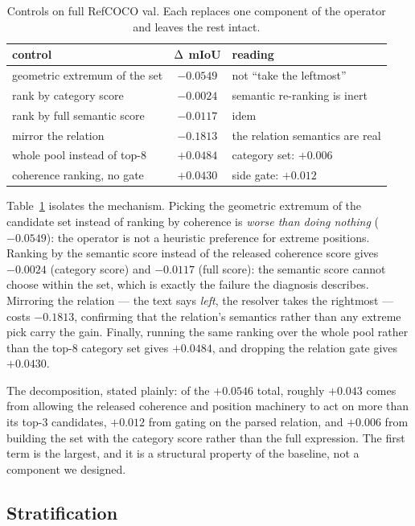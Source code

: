 \begin{table}[t]
\caption{Controls on full RefCOCO val. Each replaces one component of the
operator and leaves the rest intact.}
\label{tab:controls}
\centering
\footnotesize
\setlength{\tabcolsep}{4pt}
\begin{tabular}{@{}lcl@{}}
\toprule
control & $\Delta$ mIoU & reading \\
\midrule
geometric extremum of the set & $-0.0549$ & not ``take the leftmost'' \\
rank by category score        & $-0.0024$ & semantic re-ranking is inert \\
rank by full semantic score   & $-0.0117$ & idem \\
mirror the relation           & $-0.1813$ & the relation semantics are real \\
whole pool instead of top-8   & $+0.0484$ & category set: $+0.006$ \\
coherence ranking, no gate    & $+0.0430$ & side gate: $+0.012$ \\
\bottomrule
\end{tabular}
\end{table}

Table~\ref{tab:controls} isolates the mechanism. Picking the geometric extremum
of the candidate set instead of ranking by coherence is \emph{worse than doing
nothing} ($-0.0549$): the operator is not a heuristic preference for extreme
positions. Ranking by the semantic score instead of the released coherence
score gives $-0.0024$ (category score) and $-0.0117$ (full score): the semantic
score cannot choose within the set, which is exactly the failure the diagnosis
describes. Mirroring the relation --- the text says \emph{left}, the resolver
takes the rightmost --- costs $-0.1813$, confirming that the relation's
semantics rather than any extreme pick carry the gain. Finally, running the
same ranking over the whole pool rather than the top-8 category set gives
$+0.0484$, and dropping the relation gate gives $+0.0430$.

The decomposition, stated plainly: of the $+0.0546$ total, roughly $+0.043$
comes from allowing the released coherence and position machinery to act on
more than its top-3 candidates, $+0.012$ from gating on the parsed relation,
and $+0.006$ from building the set with the category score rather than the full
expression. The first term is the largest, and it is a structural property of
the baseline, not a component we designed.

\subsection{Stratification}

